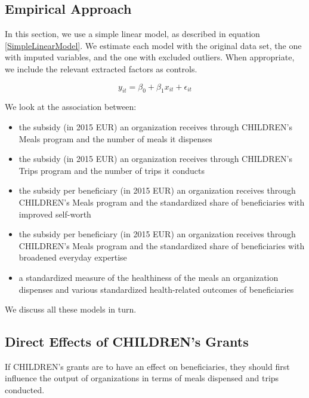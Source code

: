 \documentclass[12pt, a4paper, titlepage]{article}\usepackage[]{graphicx}\usepackage[]{color}
\begin{document}
\subsection{Empirical Approach} 

In this section, we use a simple linear model, as described in equation \ref{SimpleLinearModel}. We estimate each model with the original data set, the one with imputed variables, and the one with excluded outliers. When appropriate, we include the relevant extracted factors as controls. 

\begin{equation}
\label{SimpleLinearModel}
  y_{it} = \beta_0 + \beta_1 x_{it} + \epsilon_{it}
\end{equation}

 We look at the association between: 

\begin{itemize}
  \item{the subsidy (in 2015 EUR) an organization receives through CHILDREN's Meals program and the number of meals it dispenses}
  \item{the subsidy (in 2015 EUR) an organization receives through CHILDREN's Trips program and the number of trips it conducts}
  \item{the subsidy per beneficiary (in 2015 EUR) an organization receives through CHILDREN's Meals program and the standardized share of beneficiaries with improved self-worth}
  \item{the subsidy per beneficiary (in 2015 EUR) an organization receives through CHILDREN's Meals program and the standardized share of beneficiaries with broadened everyday expertise}
   \item{a standardized measure of the healthiness of the meals an organization dispenses and various standardized health-related outcomes of beneficiaries} 
\end{itemize}

We discuss all these models in turn.

\subsection{Direct Effects of CHILDREN's Grants} 

If CHILDREN's grants are to have an effect on beneficiaries, they should first influence the output of organizations in terms of meals dispensed and trips conducted. 
\end{document}
